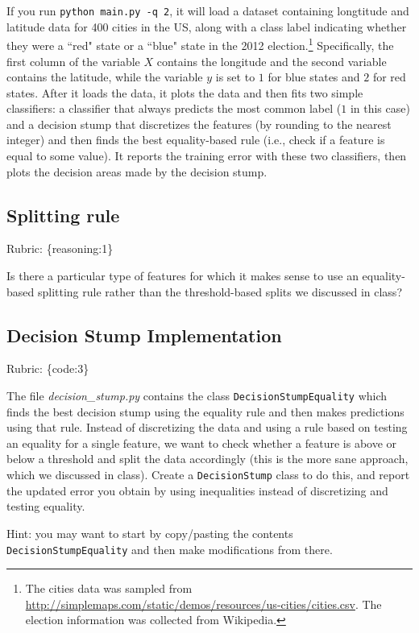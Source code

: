 \documentclass{article}
\def\blu#1{{\color{blu}#1}}
\def\gre#1{{\color{gre}#1}}
\def\rubric#1{\gre{Rubric: \{#1\}}}{}
\begin{document}
If you run \texttt{python main.py -q 2}, it will load a dataset containing longtitude and latitude data for 400 cities in the US, along with a class label indicating whether they were a ``red" state or a ``blue" state in the 2012 election.\footnote{The cities data was sampled from \url{http://simplemaps.com/static/demos/resources/us-cities/cities.csv}. The election information was collected from Wikipedia.}
Specifically, the first column of the variable $X$ contains the longitude and the second variable contains the latitude,
while the variable $y$ is set to $1$ for blue states and $2$ for red states.
After it loads the data, it plots the data and then fits two simple classifiers: a classifier that always predicts the
most common label ($1$ in this case) and a decision stump
that discretizes the features (by rounding to the nearest integer)
and then finds the best equality-based rule (i.e., check
 if a feature is equal to some value).
It reports the training error with these two classifiers, then plots the decision areas made by the decision stump.

\subsection{Splitting rule}
\rubric{reasoning:1}

Is there a particular type of features for which it makes sense to use an equality-based splitting rule rather than the threshold-based splits we discussed in class?


\subsection{Decision Stump Implementation}
\rubric{code:3}

The file \emph{decision\_stump.py} contains the class \texttt{DecisionStumpEquality} which finds the best decision stump using the equality rule and then makes predictions using that rule. Instead of discretizing the data and using a rule based on testing an equality for a single feature, we want to check whether a feature is above or below a threshold and split the data accordingly (this is the more sane approach, which we discussed in class). \blu{Create a \texttt{DecisionStump} class to do this, and report the updated error you obtain by using inequalities instead of discretizing and testing equality.}

Hint: you may want to start by copy/pasting the contents \texttt{DecisionStumpEquality} and then make modifications from there. 
\end{document}
